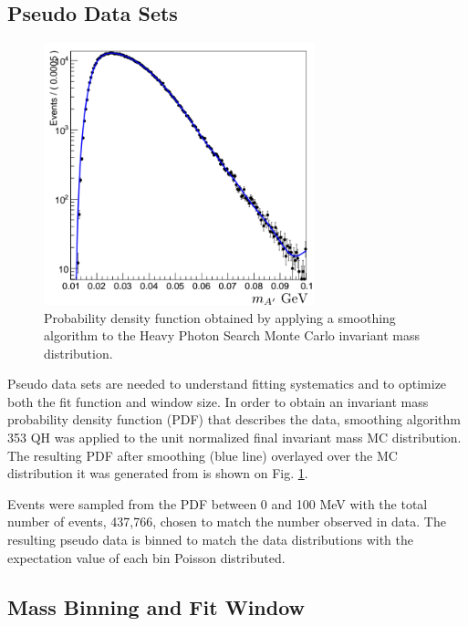 \subsection{Pseudo Data Sets}

\begin{figure}[ht]
    \centering
    \includegraphics[width=0.7\textwidth]{images/smooth_pdf.png}
    \caption{Probability density function obtained by applying a smoothing algorithm 
             to the Heavy Photon Search Monte Carlo invariant mass distribution.}
    \label{fig:smooth_pdf}
\end{figure}

Pseudo data sets are needed to understand fitting systematics and to optimize
both
the fit function and window size.  In order to obtain an invariant mass probability
density function (PDF) that describes the data, smoothing algorithm 353 QH 
\cite{Friedman:1974vj} was
applied to the unit normalized final invariant mass MC distribution.  The resulting
PDF after smoothing (blue line) overlayed over the MC distribution it was generated 
from is shown on Fig. \ref{fig:smooth_pdf}.
 
Events were sampled from the PDF between 0 and 100 MeV with the total number of
events, 437,766, chosen to match the number observed in data.  The resulting
pseudo data is binned to match the data distributions with the expectation
value of each bin Poisson distributed.

\subsection{Mass Binning and Fit Window}

